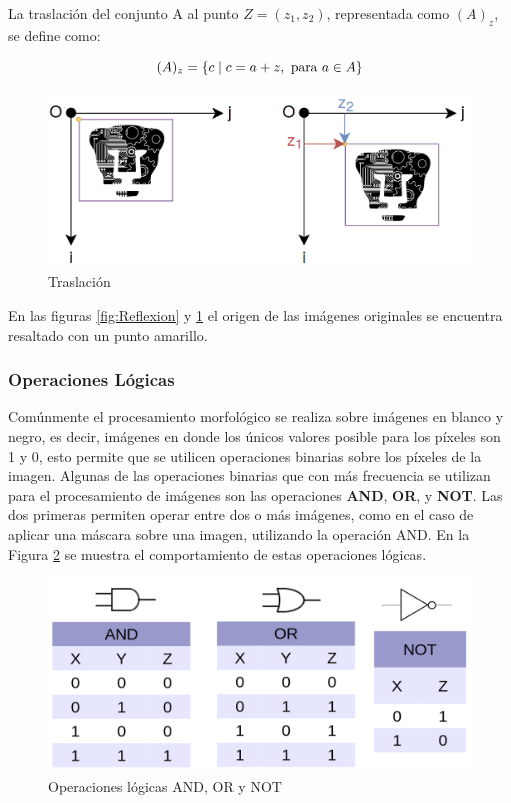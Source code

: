La traslación del conjunto A al punto $Z = (z_{1}, z_{2})$, representada como $(A)_{z}$, se define como:

\begin{equation}
(A)_{z} = \{ c \mid c = a+z, \textup{ para } a \in A \}
\label{eqn:traslacion}
\end{equation}

\begin{figure}[H]
\centering
\includegraphics[scale=0.32]{Figures/Traslacion.png}
    \caption{Traslación}
    \label{fig:Traslacion}
\end{figure}

En las figuras \ref{fig:Reflexion} y \ref{fig:Traslacion} el origen de las imágenes originales se encuentra resaltado con un punto amarillo.

\subsubsection{Operaciones Lógicas}

Comúnmente el procesamiento morfológico se realiza sobre imágenes en blanco y negro, es decir, imágenes en donde los únicos valores posible para los píxeles son 1 y 0, esto permite que se utilicen operaciones binarias sobre los píxeles de la imagen. 
Algunas de las operaciones binarias que con más frecuencia se utilizan para el procesamiento de imágenes son las operaciones \textbf{AND}, \textbf{OR}, y \textbf{NOT}. Las dos primeras permiten operar entre dos o más imágenes, como en el caso de aplicar una máscara sobre una imagen, utilizando la operación AND. En la Figura \ref{fig:LogicOp} se muestra el comportamiento de estas operaciones lógicas.

\begin{figure}[H]
\centering
\includegraphics[scale=0.2]{Figures/CompuertasLogicas.png}
    \caption{Operaciones lógicas AND, OR y NOT}
    \label{fig:LogicOp}
\end{figure}

